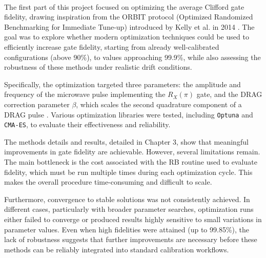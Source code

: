 \paragraph{}
The first part of this project focused on optimizing the average Clifford gate fidelity, drawing inspiration from the ORBIT protocol (Optimized Randomized Benchmarking for Immediate Tune-up) introduced by Kelly et al. in 2014 \cite{kelly_optimal_2014}. 
The goal was to explore whether modern optimization techniques could be used to efficiently increase gate fidelity, starting from already well-calibrated configurations (above 90\%), to values approaching 99.9\%, while also assessing the robustness of these methods under realistic drift conditions.

Specifically, the optimization targeted three parameters: the amplitude and frequency of the microwave pulse implementing the $R_X(\pi)$ gate, and the DRAG correction parameter $\beta$, which scales the second quadrature component of a DRAG pulse \cite{Motzoi_2009}. 
Various optimization libraries were tested, including \texttt{Optuna} and \texttt{CMA-ES}, to evaluate their effectiveness and reliability.

The methods details and results, detailed in Chapter 3, show that meaningful improvements in gate fidelity are achievable. 
However, several limitations remain. The main bottleneck is the cost associated with the RB routine used to evaluate fidelity, which must be run multiple times during each optimization cycle. This makes the overall procedure time-consuming and difficult to scale.

Furthermore, convergence to stable solutions was not consistently achieved. 
In different cases, particularly with broader parameter searches, optimization runs either failed to converge or produced results highly sensitive to small variations in parameter values. 
Even when high fidelities were attained (up to 99.85\%), the lack of robustness suggests that further improvements are necessary before these methods can be reliably integrated into standard calibration workflows.

